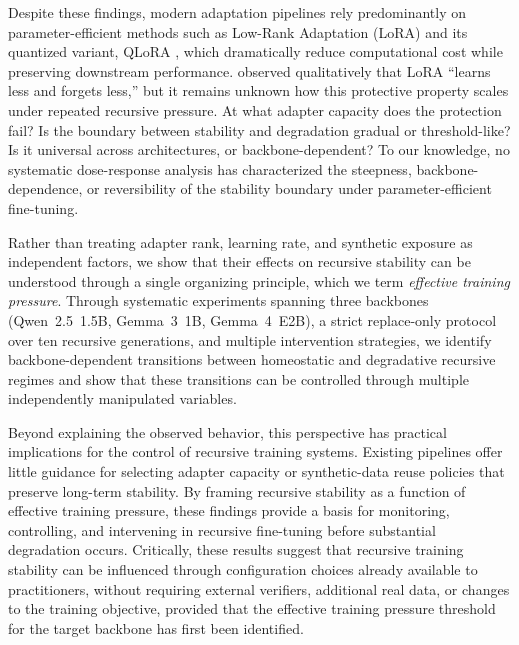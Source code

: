 \documentclass[a4paper,fleqn]{cas-dc}
\newif\ifshowchanges
\newcommand{\rev}[1]{\ifshowchanges{\color{blue}#1}\else{#1}\fi}
\begin{document}
Despite these findings, modern adaptation pipelines rely predominantly on
parameter-efficient methods such as \rev{Low-Rank Adaptation (LoRA)} \citep{hu2022} and \rev{its quantized variant, QLoRA}
\citep{dettmers2023}, which dramatically reduce computational cost while
preserving downstream performance. \citet{biderman2024} observed qualitatively
that LoRA ``learns less and forgets less,'' but it remains unknown how this
protective property scales under repeated recursive pressure. At what adapter
capacity does the protection fail? Is the boundary between stability and
degradation gradual or threshold-like? Is it universal across architectures, or
backbone-dependent? To our knowledge, no systematic dose-response analysis has
characterized the \rev{steepness}, backbone-dependence, or reversibility of the
stability boundary under parameter-efficient fine-tuning.

Rather than treating adapter rank, learning rate, and synthetic exposure as
independent factors, we show that their effects on recursive stability can be
understood through a single organizing principle, which we term
\textit{effective training pressure}. Through systematic experiments spanning
three backbones (Qwen~2.5~1.5B, Gemma~3~1B, Gemma~4~E2B), a strict replace-only
protocol over ten recursive generations, and multiple intervention strategies, we
identify \rev{backbone-dependent transitions between homeostatic and degradative}
recursive regimes and show that these transitions can be controlled through
multiple independently manipulated variables.

Beyond explaining the observed behavior, this perspective has practical
implications for the control of recursive training systems. Existing
pipelines offer little guidance for selecting adapter capacity or synthetic-data
reuse policies that preserve long-term stability. By framing recursive stability
as a function of effective training pressure, these findings provide a
basis for monitoring, controlling, and intervening in recursive fine-tuning
before substantial degradation occurs. Critically, these results suggest that
recursive training stability can be influenced through configuration choices
already available to practitioners, without requiring external verifiers,
additional real data, or changes to the training objective, provided that the
effective training pressure threshold for the target backbone has first been
identified.
\end{document}
